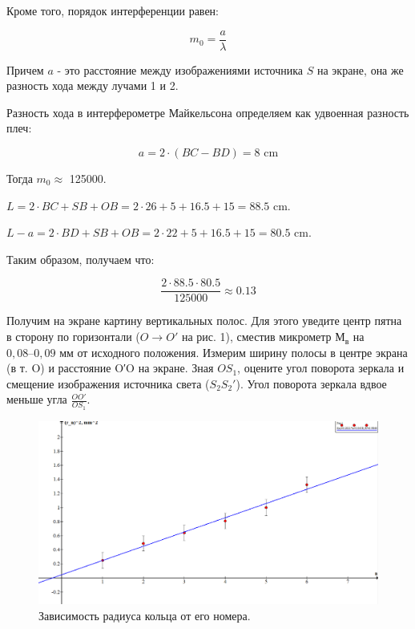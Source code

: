 \documentclass[15pt,a5paper,reqno]{article}
\begin{document}
Кроме того, порядок интерференции равен: 

\[    m_0 = \frac{a}{\lambda}           \]

Причем $a$ - это расстояние между изображениями источника $S$ на экране, она же разность хода между лучами 1 и 2.

Разность хода в интерферометре Майкельсона определяем как удвоенная разность плеч:

\[    a = 2 \cdot (BC - BD)  = 8 \text{  cm}  \]


Тогда $m_0  \approx $ 125000. 

$ L =  2\cdot BC + SB + OB = 2 \cdot 26 + 5 + 16.5 + 15 = 88.5$ cm.

$ L - a = 2\cdot BD + SB + OB = 2 \cdot 22 + 5 + 16.5 + 15 = 80.5 $ cm.

Таким образом, получаем что: 

\[    \frac{2\cdot 88.5 \cdot 80.5}{125000} \approx  0.13   \]

Получим на экране картину вертикальных полос. Для этого уведите
центр пятна в сторону по горизонтали ($O \rightarrow O′$ на рис. 1), сместив микрометр $М_в$ на $0,08–0,09$ мм от исходного положения. Измерим ширину
полосы в центре экрана (в т. O) и расстояние O′O на экране. Зная $OS_1$,
оцените угол поворота зеркала и смещение изображения источника света ($S_2S_2′$).
Угол поворота зеркала вдвое меньше угла $\frac{OO′}{OS_1}$.



\begin{figure}[h!]
  \centering
  \includegraphics[width=1\linewidth]{pics/lab_4_2_4_1.png}
  \caption{Зависимость радиуса кольца от его номера.}
  \label{}
\end{figure}
\end{document}
